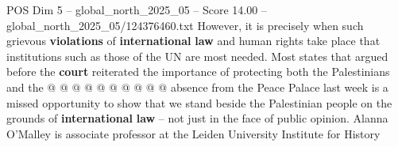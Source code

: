 \begin{textsample}{POS Dim 5 – global\_north\_2025\_05 – Score 14.00 – global\_north\_2025\_05/124376460.txt}
However, it is precisely when such grievous \textbf{violations} of \textbf{international} \textbf{law} and human rights take place that institutions such as those of the UN are most needed.
Most states that argued before the \textbf{court} reiterated the importance of protecting both the Palestinians and the @ @ @ @ @ @ @ @ @ @ absence from the Peace Palace last week is a missed opportunity to show that we stand beside the Palestinian people on the grounds of \textbf{international} \textbf{law} -- not just in the face of public opinion.
Alanna O'Malley is associate professor at the Leiden University Institute for History

\end{textsample}
